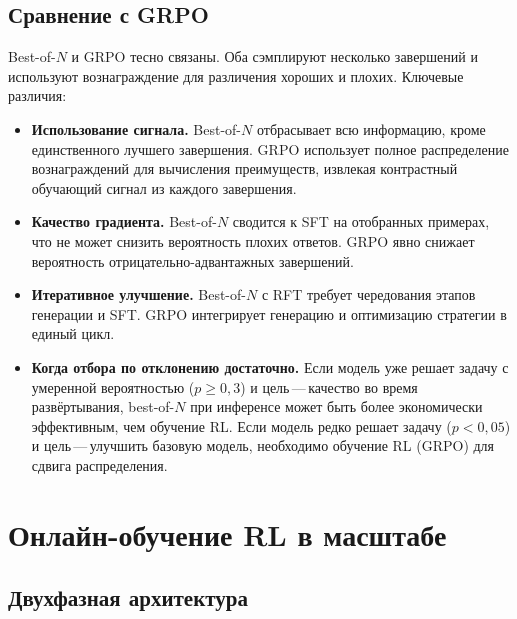 \subsection{Сравнение с GRPO}

Best-of-$N$ и GRPO тесно связаны. Оба сэмплируют несколько завершений и используют вознаграждение для различения хороших и плохих. Ключевые различия:
\begin{itemize}[leftmargin=*]
  \item \textbf{Использование сигнала.} Best-of-$N$ отбрасывает всю информацию, кроме единственного лучшего завершения. GRPO использует полное распределение вознаграждений для вычисления преимуществ, извлекая контрастный обучающий сигнал из каждого завершения.
  \item \textbf{Качество градиента.} Best-of-$N$ сводится к SFT на отобранных примерах, что не может снизить вероятность плохих ответов. GRPO явно снижает вероятность отрицательно-адвантажных завершений.
  \item \textbf{Итеративное улучшение.} Best-of-$N$ с RFT требует чередования этапов генерации и SFT. GRPO интегрирует генерацию и оптимизацию стратегии в единый цикл.
  \item \textbf{Когда отбора по отклонению достаточно.} Если модель уже решает задачу с умеренной вероятностью ($p \geq 0{,}3$) и цель\,---\,качество во время развёртывания, best-of-$N$ при инференсе может быть более экономически эффективным, чем обучение RL. Если модель редко решает задачу ($p < 0{,}05$) и цель\,---\,улучшить базовую модель, необходимо обучение RL (GRPO) для сдвига распределения.
\end{itemize}

\section{Онлайн-обучение RL в масштабе}
\label{sec:grpo-scale}


\subsection{Двухфазная архитектура}


